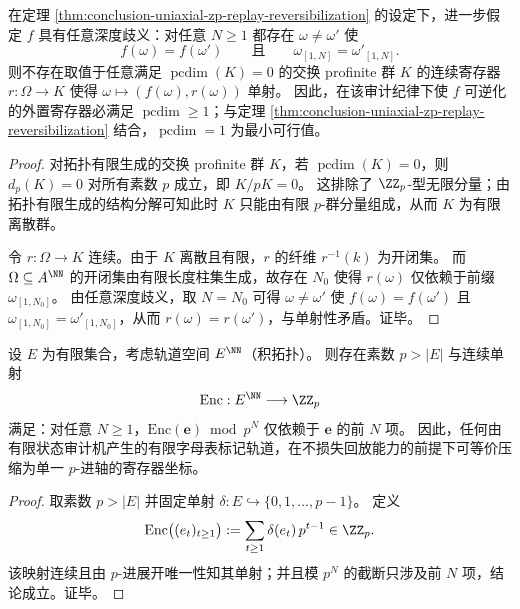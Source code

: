 \begin{proposition}[任意深度歧义排除有限寄存器：\texorpdfstring{$\operatorname{pcdim}\ge 1$}{pcdim>=1} 的必要性]\label{prop:conclusion-pcdim-lowerbound-deep-ambiguity}
在定理 \ref{thm:conclusion-uniaxial-zp-replay-reversibilization} 的设定下，进一步假定 \(f\) 具有任意深度歧义：对任意 \(N\ge 1\) 都存在 \(\omega\neq \omega'\) 使
\[
f(\omega)=f(\omega')\qquad\text{且}\qquad \omega_{[1,N]}=\omega'_{[1,N]}.
\]
则不存在取值于任意满足 \(\operatorname{pcdim}(K)=0\) 的交换 profinite 群 \(K\) 的连续寄存器 \(r:\Omega\to K\) 使得 \(\omega\mapsto (f(\omega),r(\omega))\) 单射。
因此，在该审计纪律下使 \(f\) 可逆化的外置寄存器必满足 \(\operatorname{pcdim}\ge 1\)；与定理 \ref{thm:conclusion-uniaxial-zp-replay-reversibilization} 结合，\(\operatorname{pcdim}=1\) 为最小可行值。
\end{proposition}
\begin{proof}
对拓扑有限生成的交换 profinite 群 \(K\)，若 \(\operatorname{pcdim}(K)=0\)，则 \(d_p(K)=0\) 对所有素数 \(p\) 成立，即 \(K/pK=0\)。
这排除了 \(\ZZ_p\)-型无限分量；由拓扑有限生成的结构分解可知此时 \(K\) 只能由有限 \(p\)-群分量组成，从而 \(K\) 为有限离散群。
\par
令 \(r:\Omega\to K\) 连续。由于 \(K\) 离散且有限，\(r\) 的纤维 \(r^{-1}(k)\) 为开闭集。
而 \(\Omega\subseteq A^{\NN}\) 的开闭集由有限长度柱集生成，故存在 \(N_0\) 使得 \(r(\omega)\) 仅依赖于前缀 \(\omega_{[1,N_0]}\)。
由任意深度歧义，取 \(N=N_0\) 可得 \(\omega\neq\omega'\) 使 \(f(\omega)=f(\omega')\) 且 \(\omega_{[1,N_0]}=\omega'_{[1,N_0]}\)，从而 \(r(\omega)=r(\omega')\)，与单射性矛盾。证毕。
\end{proof}

\begin{proposition}\label{prop:conclusion-uniaxial-padic-trace-encoding}
设 \(E\) 为有限集合，考虑轨道空间 \(E^{\NN}\)（积拓扑）。
则存在素数 \(p>|E|\) 与连续单射
\[
\mathrm{Enc}:E^{\NN}\longrightarrow \ZZ_p
\]
满足：对任意 \(N\ge 1\)，\(\mathrm{Enc}(\mathbf e)\bmod p^N\) 仅依赖于 \(\mathbf e\) 的前 \(N\) 项。
因此，任何由有限状态审计机产生的有限字母表标记轨道，在不损失回放能力的前提下可等价压缩为单一 \(p\)-进轴的寄存器坐标。
\end{proposition}
\begin{proof}
取素数 \(p>|E|\) 并固定单射 \(\delta:E\hookrightarrow\{0,1,\dots,p-1\}\)。
定义
\[
\mathrm{Enc}\bigl((e_t)_{t\ge 1}\bigr):=\sum_{t\ge 1}\delta(e_t)\,p^{t-1}\in\ZZ_p.
\]
该映射连续且由 \(p\)-进展开唯一性知其单射；并且模 \(p^N\) 的截断只涉及前 \(N\) 项，结论成立。证毕。
\end{proof}

